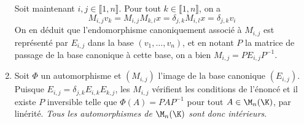 \begin{enonce}
\begin{solution}
\begin{enumerate}
    Soit maintenant $i,j\in\llbracket 1,n\rrbracket$.
    Pour tout $k\in\llbracket 1,n\rrbracket$, on a
    \[M_{i,j}v_k=M_{i,j}M_{k,l}x=\delta_{j,k}M_{i,l}x
      =\delta_{j,k}v_i\]
    On en déduit que l'endomorphisme canoniquement associé à
    $M_{i,j}$ est représenté par $E_{i,j}$ dans la base
    $(v_1,\ldots,v_n)$, et en notant $P$ la matrice de passage de la
    base canonique à cette base, on a bien $M_{i,j}=PE_{i,j}P^{-1}$.
  \item Soit $\Phi$ un automorphisme et $(M_{i,j})$ l'image de la base
    canonique $(E_{i,j})$. Puisque
    $E_{i,j}=\delta_{j,k}E_{i,k}E_{k,j}$, les $M_{i,j}$ vérifient les
    conditions de l'énoncé et il existe $P$ inversible telle que
    $\Phi(A)=PAP^{-1}$ pour tout $A\in\M_n(\K)$, par
    linérité. {\itshape Tous
    les automorphismes de $\M_n(\K)$ sont donc intérieurs}.
  \end{enumerate}
\end{solution}
\end{enonce}